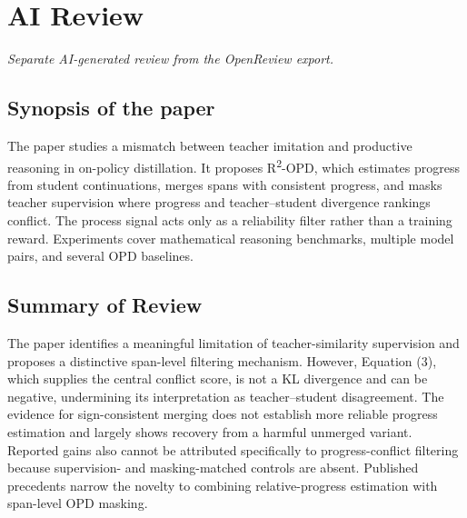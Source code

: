 \section{AI Review}
\label{reviewer:ai}
\noindent\textit{Separate AI-generated review from the OpenReview export.}

\subsection*{Synopsis of the paper}
The paper studies a mismatch between teacher imitation and productive reasoning in on-policy distillation. It proposes R\textsuperscript{2}-OPD, which estimates progress from student continuations, merges spans with consistent progress, and masks teacher supervision where progress and teacher--student divergence rankings conflict. The process signal acts only as a reliability filter rather than a training reward. Experiments cover mathematical reasoning benchmarks, multiple model pairs, and several OPD baselines.

\subsection*{Summary of Review}
The paper identifies a meaningful limitation of teacher-similarity supervision and proposes a distinctive span-level filtering mechanism. However, Equation (3), which supplies the central conflict score, is not a KL divergence and can be negative, undermining its interpretation as teacher--student disagreement. The evidence for sign-consistent merging does not establish more reliable progress estimation and largely shows recovery from a harmful unmerged variant. Reported gains also cannot be attributed specifically to progress-conflict filtering because supervision- and masking-matched controls are absent. Published precedents narrow the novelty to combining relative-progress estimation with span-level OPD masking.

